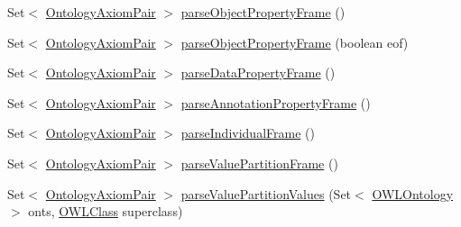 \begin{DoxyCompactItemize}
\item 
Set$<$ \hyperlink{classorg_1_1coode_1_1owlapi_1_1manchesterowlsyntax_1_1_ontology_axiom_pair}{Ontology\-Axiom\-Pair} $>$ \hyperlink{classorg_1_1coode_1_1owlapi_1_1manchesterowlsyntax_1_1_manchester_o_w_l_syntax_editor_parser_a5b3e21c9cc572e0235015b989895b467}{parse\-Object\-Property\-Frame} ()
\item 
Set$<$ \hyperlink{classorg_1_1coode_1_1owlapi_1_1manchesterowlsyntax_1_1_ontology_axiom_pair}{Ontology\-Axiom\-Pair} $>$ \hyperlink{classorg_1_1coode_1_1owlapi_1_1manchesterowlsyntax_1_1_manchester_o_w_l_syntax_editor_parser_af0b075518025515e18cab4645e2fd0b9}{parse\-Object\-Property\-Frame} (boolean eof)
\item 
Set$<$ \hyperlink{classorg_1_1coode_1_1owlapi_1_1manchesterowlsyntax_1_1_ontology_axiom_pair}{Ontology\-Axiom\-Pair} $>$ \hyperlink{classorg_1_1coode_1_1owlapi_1_1manchesterowlsyntax_1_1_manchester_o_w_l_syntax_editor_parser_a94f2566a3b929b6abb8dd9795f7472e0}{parse\-Data\-Property\-Frame} ()
\item 
Set$<$ \hyperlink{classorg_1_1coode_1_1owlapi_1_1manchesterowlsyntax_1_1_ontology_axiom_pair}{Ontology\-Axiom\-Pair} $>$ \hyperlink{classorg_1_1coode_1_1owlapi_1_1manchesterowlsyntax_1_1_manchester_o_w_l_syntax_editor_parser_a7a4e65990b6013f12259829904cf7416}{parse\-Annotation\-Property\-Frame} ()
\item 
Set$<$ \hyperlink{classorg_1_1coode_1_1owlapi_1_1manchesterowlsyntax_1_1_ontology_axiom_pair}{Ontology\-Axiom\-Pair} $>$ \hyperlink{classorg_1_1coode_1_1owlapi_1_1manchesterowlsyntax_1_1_manchester_o_w_l_syntax_editor_parser_ac61016700673cbe74cacd178316fab05}{parse\-Individual\-Frame} ()
\item 
Set$<$ \hyperlink{classorg_1_1coode_1_1owlapi_1_1manchesterowlsyntax_1_1_ontology_axiom_pair}{Ontology\-Axiom\-Pair} $>$ \hyperlink{classorg_1_1coode_1_1owlapi_1_1manchesterowlsyntax_1_1_manchester_o_w_l_syntax_editor_parser_a12262a688b597b2a956ec4f44c6ed38c}{parse\-Value\-Partition\-Frame} ()
\item 
Set$<$ \hyperlink{classorg_1_1coode_1_1owlapi_1_1manchesterowlsyntax_1_1_ontology_axiom_pair}{Ontology\-Axiom\-Pair} $>$ \hyperlink{classorg_1_1coode_1_1owlapi_1_1manchesterowlsyntax_1_1_manchester_o_w_l_syntax_editor_parser_a438ed088220c30f3212a08999832141c}{parse\-Value\-Partition\-Values} (Set$<$ \hyperlink{interfaceorg_1_1semanticweb_1_1owlapi_1_1model_1_1_o_w_l_ontology}{O\-W\-L\-Ontology} $>$ onts, \hyperlink{interfaceorg_1_1semanticweb_1_1owlapi_1_1model_1_1_o_w_l_class}{O\-W\-L\-Class} superclass)

\end{DoxyCompactItemize}

